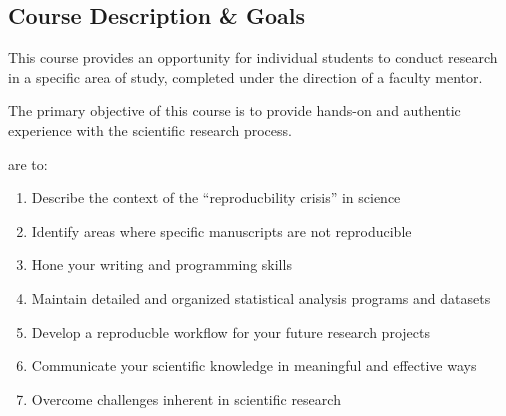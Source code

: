 \documentclass{tufte-handout}
\begin{document}
\begin{fullwidth}

\section{Course Description \& Goals}

This course provides an opportunity for individual students to conduct research in a specific area of study, completed under the direction of a faculty mentor.%


The primary objective of this course is to provide hands-on and authentic experience with the scientific research process. 

 are to:

\begin{enumerate}
	\item Describe the context of the ``reproducbility crisis'' in science
	\item Identify areas where specific manuscripts are not reproducible
	\item Hone your writing and programming skills
	\item Maintain detailed and organized statistical analysis programs and datasets
	\item Develop a reproducble workflow for your future research projects
	\item Communicate your scientific knowledge in meaningful and effective ways
	\item Overcome challenges inherent in scientific research
\end{enumerate}




\end{fullwidth}
\end{document}
